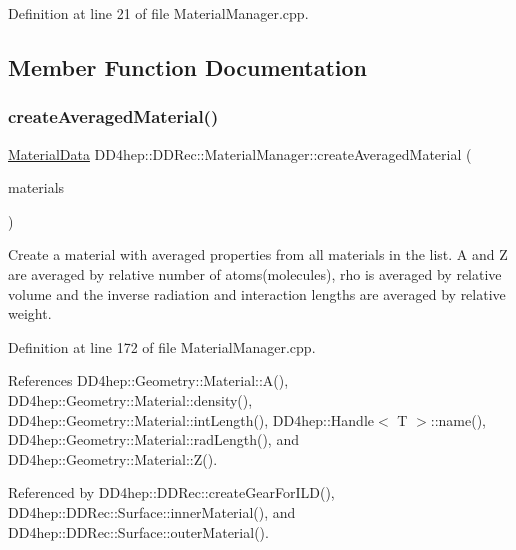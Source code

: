 Definition at line 21 of file Material\+Manager.\+cpp.



\subsection{Member Function Documentation}
\hypertarget{class_d_d4hep_1_1_d_d_rec_1_1_material_manager_a44243f88b984a698c8b823885c439702}{}\label{class_d_d4hep_1_1_d_d_rec_1_1_material_manager_a44243f88b984a698c8b823885c439702} 
\subsubsection{\texorpdfstring{create\+Averaged\+Material()}{createAveragedMaterial()}}
{\footnotesize\ttfamily \hyperlink{class_d_d4hep_1_1_d_d_rec_1_1_material_data}{Material\+Data} D\+D4hep\+::\+D\+D\+Rec\+::\+Material\+Manager\+::create\+Averaged\+Material (\begin{DoxyParamCaption}\item[{const \hyperlink{namespace_d_d4hep_1_1_d_d_rec_a69fdab2f851316d2b9e50956920359f7}{Material\+Vec} \&}]{materials }\end{DoxyParamCaption})}

Create a material with averaged properties from all materials in the list. A and Z are averaged by relative number of atoms(molecules), rho is averaged by relative volume and the inverse radiation and interaction lengths are averaged by relative weight. 

Definition at line 172 of file Material\+Manager.\+cpp.



References D\+D4hep\+::\+Geometry\+::\+Material\+::\+A(), D\+D4hep\+::\+Geometry\+::\+Material\+::density(), D\+D4hep\+::\+Geometry\+::\+Material\+::int\+Length(), D\+D4hep\+::\+Handle$<$ T $>$\+::name(), D\+D4hep\+::\+Geometry\+::\+Material\+::rad\+Length(), and D\+D4hep\+::\+Geometry\+::\+Material\+::\+Z().



Referenced by D\+D4hep\+::\+D\+D\+Rec\+::create\+Gear\+For\+I\+L\+D(), D\+D4hep\+::\+D\+D\+Rec\+::\+Surface\+::inner\+Material(), and D\+D4hep\+::\+D\+D\+Rec\+::\+Surface\+::outer\+Material().

